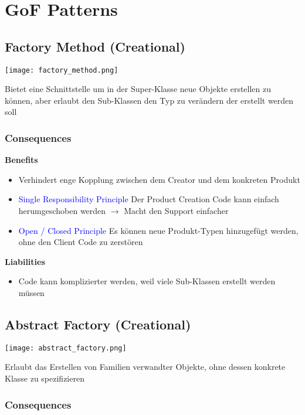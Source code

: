 \section{GoF Patterns}

\subsection{Factory Method (Creational)}

\texttt{[image: factory\_method.png]}

Bietet eine Schnittstelle um in der Super-Klasse neue Objekte erstellen zu können, aber erlaubt den Sub-Klassen den Typ zu verändern der erstellt werden soll

\subsubsection{Consequences}

\textbf{Benefits}
\begin{itemize}
    \item Verhindert enge Kopplung zwischen dem Creator und dem konkreten Produkt
    \item \textcolor{blue}{Single Responsibility Principle} Der Product Creation Code kann einfach herumgeschoben werden $\rightarrow$ Macht den Support einfacher
    \item \textcolor{blue}{Open / Closed Principle} Es können neue Produkt-Typen hinzugefügt werden, ohne den Client Code zu zerstören
\end{itemize}
\vspace{10pt}
\textbf{Liabilities}
\begin{itemize}
    \item Code kann komplizierter werden, weil viele Sub-Klassen erstellt werden müssen
\end{itemize}

\subsection{Abstract Factory (Creational)}

\texttt{[image: abstract\_factory.png]}

Erlaubt das Erstellen von Familien verwandter Objekte, ohne dessen konkrete Klasse zu spezifizieren

\subsubsection{Consequences}

